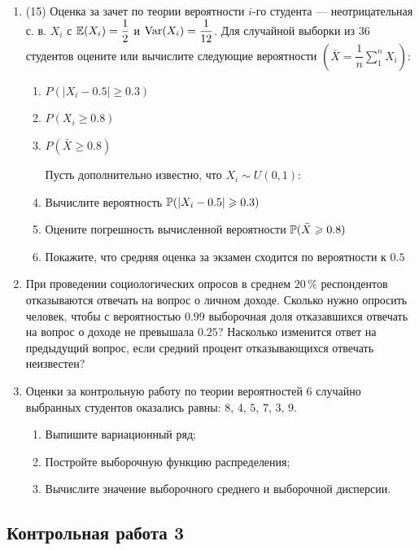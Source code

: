 \documentclass[12pt, a4paper]{article}\usepackage[]{graphicx}\usepackage[]{color}
\begin{document}
\begin{enumerate}
					\item (15) Оценка за зачет по теории вероятности $i$-го студента — неотрицательная с. в. $X_i$ с $\E(X_i)=\dfrac{1}{2}$ и $\Var(X_i)=\dfrac{1}{12}$. Для случайной выборки из $36$ студентов оцените или вычислите следующие вероятности $\left(\bar{X} = \dfrac{1}{n} \sum \limits_1^n X_i \right)$:
					\begin{enumerate}
						\item $P(|X_i-0.5|\geqslant 0.3)$
						\item $P(X_i\geqslant 0.8)$
						\item $P(\bar{X}\geqslant 0.8)$

						Пусть дополнительно известно, что $X_i \sim U(0,1)$:
						\item Вычислите вероятность $\P(|X_i-0.5|\geqslant 0.3)$
						\item Оцените погрешность вычисленной вероятности $\P(\bar{X}\geqslant 0.8)$
						\item Покажите, что средняя оценка за экзамен сходится по вероятности к $0.5$

					\end{enumerate}

					\item При проведении социологических опросов в среднем $20\,\%$ респондентов отказываются отвечать на вопрос о личном доходе. Сколько нужно опросить человек, чтобы с вероятностью $0.99$ выборочная доля отказавшихся отвечать на вопрос о доходе не превышала $0.25$? Насколько изменится ответ на предыдущий вопрос, если средний процент отказывающихся отвечать неизвестен?

					\item Оценки за контрольную работу по теории вероятностей $6$ случайно выбранных студентов оказались равны: $8$, $4$, $5$, $7$, $3$, $9$.
					\begin{enumerate}
						\item Выпишите вариационный ряд;
						\item Постройте выборочную функцию распределения;
						\item Вычислите значение выборочного среднего и выборочной дисперсии.
					\end{enumerate}

				\end{enumerate}


				\subsection{Контрольная работа 3}
\end{document}
